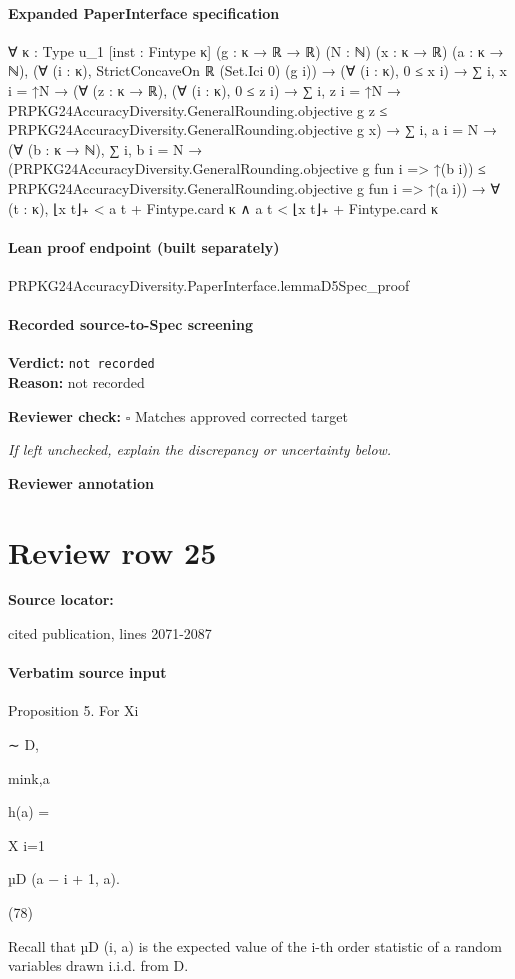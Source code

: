 \documentclass[10pt]{article}
\newcommand{\reviewerbox}{%
  \par\noindent\fbox{\parbox{0.96\linewidth}{\rule{0pt}{0.38in}}}\par
}
\newcommand{\reviewmatch}[1]{%
  \par\noindent\textbf{Reviewer check:} $\square$\; #1\par
  \noindent\emph{If left unchecked, explain the discrepancy or uncertainty below.}\par
}
\begin{document}
\paragraph{Expanded PaperInterface specification}
\begin{ReviewVerbatim}
∀ {κ : Type u_1} [inst : Fintype κ] (g : κ → ℝ → ℝ) (N : ℕ) (x : κ → ℝ) (a : κ → ℕ),
  (∀ (i : κ), StrictConcaveOn ℝ (Set.Ici 0) (g i)) →
    (∀ (i : κ), 0 ≤ x i) →
      ∑ i, x i = ↑N →
        (∀ (z : κ → ℝ),
            (∀ (i : κ), 0 ≤ z i) →
              ∑ i, z i = ↑N →
                PRPKG24AccuracyDiversity.GeneralRounding.objective g z ≤
                  PRPKG24AccuracyDiversity.GeneralRounding.objective g x) →
          ∑ i, a i = N →
            (∀ (b : κ → ℕ),
                ∑ i, b i = N →
                  (PRPKG24AccuracyDiversity.GeneralRounding.objective g fun i => ↑(b i)) ≤
                    PRPKG24AccuracyDiversity.GeneralRounding.objective g fun i => ↑(a i)) →
              ∀ (t : κ), ⌊x t⌋₊ < a t + Fintype.card κ ∧ a t < ⌊x t⌋₊ + Fintype.card κ
\end{ReviewVerbatim}

\paragraph{Lean proof endpoint (built separately)}\begin{ReviewVerbatim}
PRPKG24AccuracyDiversity.PaperInterface.lemmaD5Spec_proof
\end{ReviewVerbatim}

\paragraph{Recorded source-to-Spec screening}
\textbf{Verdict:} \texttt{not recorded}
\\
\textbf{Reason:} not recorded
\reviewmatch{Matches approved corrected target}
\noindent\textbf{Reviewer annotation}\par
\reviewerbox
\clearpage
\hypertarget{source-claim-4a13a0b223d63917}{}
\section*{Review row 25}
\textbf{Source locator:} {\footnotesize\raggedright cited publication, lines 2071-\allowbreak{}2087\par}
\paragraph{Verbatim source input}
\begin{ReviewVerbatim}
Proposition 5. For Xi

∼ D,

min{k,a}

h(a) =

X
i=1

µD (a − i + 1, a).

(78)

Recall that µD (i, a) is the expected value of the i-th order statistic of a random variables drawn i.i.d.
from D.
\end{ReviewVerbatim}
\end{document}
